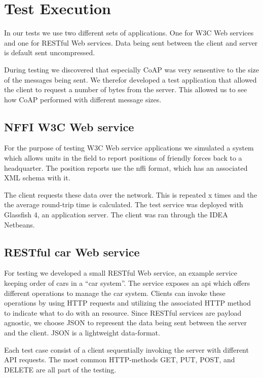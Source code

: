 \section{Test Execution}

In our tests we use two different sets of applications. One for W3C Web services
and one for RESTful  Web services. Data being sent between the client and server
is default sent uncompressed.

During testing we discovered that especially CoAP was very sensentive to the
size of the messages being sent. We therefor developed a test application that
allowed the client to request a number of bytes from the server. This allowed us
to see how CoAP performed with different message sizes.

\subsection{NFFI W3C Web service}

For the purpose of testing W3C Web service applications we simulated a system
which allows units in the field to report positions of friendly forces back to
a headquarter. The position reports use the \gls{nffi} format, which has an
associated XML schema with it.

The client requests these data over the network. This is repeated x times and
the the average round-trip time is calculated. The test service was deployed
with Glassfish 4, an application server. The client was ran through the IDEA
Netbeans.


\subsection{RESTful car Web service}

For testing we developed a small RESTful Web service, an example service
keeping order of cars in a ``car system''. The service exposes an \gls{api}
which offers different operations to manage the car system. Clients can invoke
these operations by using HTTP requests and utilizing the associated HTTP
method to indicate what to do with an resource. Since RESTful services are
payload agnostic, we choose JSON to represent the data being sent between the
server and the client. JSON is a lightweight data-format.

Each test case consist of a client sequentially invoking the server with
different API requests. The most common HTTP-methods GET, PUT, POST, and
DELETE are all part of the testing.


